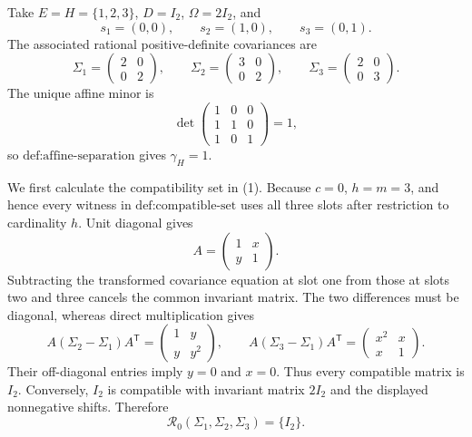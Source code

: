 Take \(E=H=\{1,2,3\}\), \(D=I_2\), \(\Omega=2I_2\), and
\[
 s_1=(0,0),\qquad s_2=(1,0),\qquad s_3=(0,1).
\]
The associated rational positive-definite covariances are
\[
 \Sigma_1=\begin{pmatrix}2&0\\0&2\end{pmatrix},
 \qquad
 \Sigma_2=\begin{pmatrix}3&0\\0&2\end{pmatrix},
 \qquad
 \Sigma_3=\begin{pmatrix}2&0\\0&3\end{pmatrix}.
\tag{1}
\]
The unique affine minor is
\[
 \det\begin{pmatrix}1&0&0\\1&1&0\\1&0&1\end{pmatrix}=1,
\]
so \(\text{def:affine-separation}\) gives \(\gamma_H=1\).

We first calculate the compatibility set in (1).  Because \(c=0\), \(h=m=3\), and hence every witness in \(\text{def:compatible-set}\) uses all three slots after restriction to cardinality \(h\).  Unit diagonal gives
\[
 A=\begin{pmatrix}1&x\\y&1\end{pmatrix}.
\]
Subtracting the transformed covariance equation at slot one from those at slots two and three cancels the common invariant matrix.  The two differences must be diagonal, whereas direct multiplication gives
\[
 A(\Sigma_2-\Sigma_1)A^{\mathsf T}
 =\begin{pmatrix}1&y\\y&y^2\end{pmatrix},
 \qquad
 A(\Sigma_3-\Sigma_1)A^{\mathsf T}
 =\begin{pmatrix}x^2&x\\x&1\end{pmatrix}.
\]
Their off-diagonal entries imply \(y=0\) and \(x=0\).  Thus every compatible matrix is \(I_2\).  Conversely, \(I_2\) is compatible with invariant matrix \(2I_2\) and the displayed nonnegative shifts.  Therefore
\[
 \mathcal R_0(\Sigma_1,\Sigma_2,\Sigma_3)=\{I_2\}.
\tag{2}
\]

